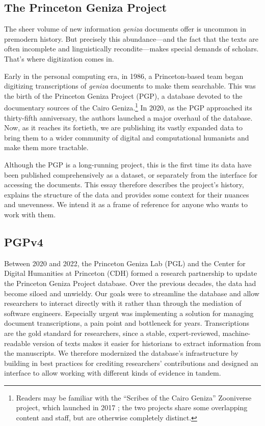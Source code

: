 \documentclass{article}
\begin{document}
\subsection{The Princeton Geniza Project}

The sheer volume of new information \textit{geniza} documents offer is uncommon in premodern history. But precisely this abundance—and the fact that the texts are often incomplete and linguistically recondite—makes special demands of scholars. That’s where digitization comes in. 

Early in the personal computing era, in 1986, a Princeton-based team began digitizing transcriptions of \textit{geniza} documents to make them searchable. This was the birth of the Princeton Geniza Project (PGP), a database devoted to the documentary sources of the Cairo Geniza.\footnote{Readers may be familiar with the ``Scribes of the Cairo Geniza'' Zooniverse project, which launched in 2017 \autocite{esten_scribes_2021}; the two projects share some overlapping content and staff,  but are otherwise completely distinct.} In 2020, as the PGP approached its thirty-fifth anniversary, the authors launched a major overhaul of the database. Now, as it reaches its fortieth, we are publishing its vastly expanded data to bring them to a wider community of digital and computational humanists and make them more tractable.

Although the PGP is a long-running project, this is the first time its data have been published comprehensively as a dataset, or separately from the interface for accessing the documents. This essay therefore describes the project’s history, explains the structure of the data and provides some context for their nuances and unevenness. We intend it as a frame of reference for anyone who wants to work with them. 

\subsection{PGPv4}

Between 2020 and 2022, the Princeton Geniza Lab (PGL) and the Center for Digital Humanities at Princeton (CDH) formed a research partnership to update the Princeton Geniza Project database. Over the previous decades, the data had become siloed and unwieldy. Our goals were to streamline the database and allow researchers to interact directly with it rather than through the mediation of software engineers. Especially urgent was implementing a solution for managing document transcriptions, a pain point and bottleneck for years. Transcriptions are the gold standard for researchers, since a stable, expert-reviewed, machine-readable version of texts makes it easier for historians to extract information from the manuscripts. We therefore modernized the database’s infrastructure by building in best practices for crediting researchers’ contributions and designed an interface to allow working with different kinds of evidence in tandem. 
\end{document}
